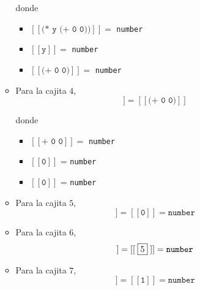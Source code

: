 \documentclass[letterpaper,11pt]{article}
\begin{document}
\begin{enumerate}
\begin{itemize}
        donde 
        \begin{itemize}
            \item $[[\texttt{(* y (+ 0 0))}]] = $ \texttt{number}
            \item $[[\texttt{y}]] = $ \texttt{number}
            \item $[[\texttt{(+ 0 0)}]] = $ \texttt{number}
        \end{itemize}

        \item Para la cajita $4$, 
        \begin{equation*}
            [[\;\fbox{4}\;]] = [[\texttt{(+ 0 0)}]]
        \end{equation*}

        donde 
        \begin{itemize}
            \item $[[\texttt{+ 0 0}]] =$ \texttt{number}
            \item $[[\texttt{0}]]$ = \texttt{number} 
            \item $[[\texttt{0}]]$ = \texttt{number} 
        \end{itemize}

        \item Para la cajita $5$, 
        \begin{equation*}
            [[\;\fbox{5}\;]] = [[\texttt{0}]] = \texttt{number}
        \end{equation*}

        \item Para la cajita $6$, 
        \begin{equation*}
            [[\;\fbox{6}\;]] = [[\;\fbox{5}\;]] = \texttt{number}
        \end{equation*}

        \item Para la cajita $7$, 
        \begin{equation*}
            [[\;\fbox{7}\;]] = [[\texttt{1}]] = \texttt{number}
        \end{equation*}
    \end{itemize}


\end{enumerate}
\end{document}
